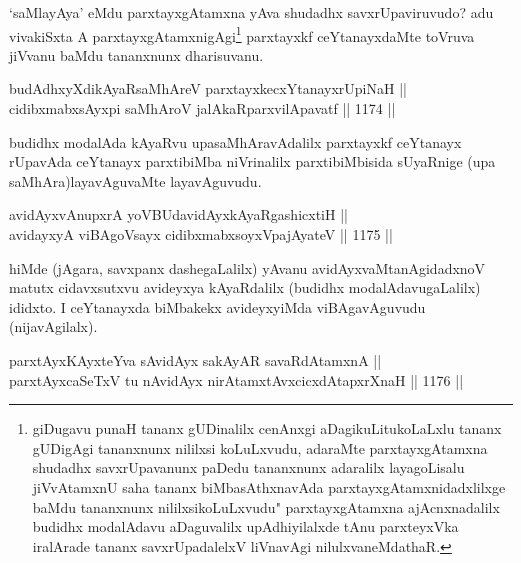 \begin{artha}
`saMlayAya' eMdu parxtayxgAtamxna yAva shudadhx savxrUpaviruvudo? adu vivakiSxta A parxtayxgAtamxnigAgi\footnote{giDugavu punaH tananx gUDinalilx cenAnxgi aDagikuLitukoLaLxlu tananx gUDigAgi tananxnunx nililxsi koLuLxvudu, adaraMte parxtayxgAtamxna shudadhx savxrUpavanunx paDedu tananxnunx adaralilx layagoLisalu jiVvAtamxnU saha tananx biMbasAthxnavAda parxtayxgAtamxnidadxlilxge baMdu tananxnunx nililxsikoLuLxvudu" parxtayxgAtamxna ajAcnxnadalilx budidhx modalAdavu aDaguvalilx upAdhiyilalxde tAnu parxteyxVka iralArade tananx savxrUpadalelxV liVnavAgi nilulxvaneMdathaR.} parxtayxkf ceYtanayxdaMte toVruva jiVvanu baMdu tananxnunx dharisuvanu.
\end{artha}


\begin{shl}
budAdhxyXdikAyaRsaMhAreV parxtayxkecxYtanayxrUpiNaH || \\
cidibxmabxsAyxpi saMhAroV jalAkaRparxvilApavatf ||  1174 ||  
\end{shl}

\begin{artha}
budidhx modalAda kAyaRvu upasaMhAravAdalilx parxtayxkf ceYtanayx rUpavAda ceYtanayx parxtibiMba niVrinalilx parxtibiMbisida sUyaRnige (upa saMhAra)layavAguvaMte layavAguvudu.
\end{artha}


\begin{shl}
avidAyxvAnupxrA yoV\s BUdavidAyxkAyaRgashicxtiH || \\
avidayxyA viBAgoV\s sayx cidibxmabxsoyxVpajAyateV ||  1175 ||  
\end{shl}

\begin{artha}
hiMde (jAgara, savxpanx dashegaLalilx) yAvanu avidAyxvaMtanAgidadxnoV matutx cidavxsutxvu avideyxya kAyaRdalilx (budidhx modalAdavugaLalilx) ididxto. I ceYtanayxda biMbakekx avideyxyiMda viBAgavAguvudu (nijavAgilalx).
\end{artha}

\begin{shl}
parxtAyxKAyxteYva sA\s vidAyx sakAyAR savaRdA\s \s tamxnA || \\
parxtAyxcaSeTxV tu nAvidAyx nirAtamxtAvxcicxdAtapxrXnaH ||  1176 ||  
\end{shl}

